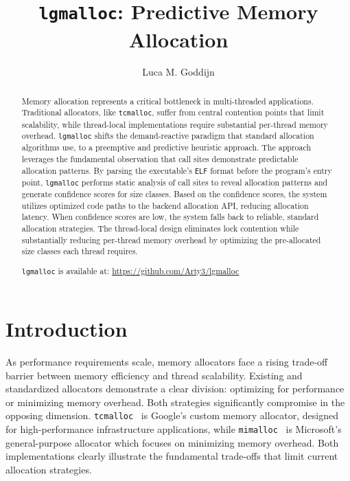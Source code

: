 \documentclass[sigconf,authordraft]{acmart}
\begin{document}

\title{\texttt{lgmalloc}: Predictive Memory Allocation}

\author{Luca M. Goddijn}

\begin{abstract}
  Memory allocation represents a critical bottleneck in multi-threaded applications.
  Traditional allocators, like \texttt{tcmalloc}, suffer from central contention points
  that limit scalability, while thread-local implementations require substantial
  per-thread memory overhead.
  \texttt{lgmalloc} shifts the demand-reactive paradigm that standard allocation
  algorithms use, to a preemptive and predictive heuristic approach.
  The approach leverages the fundamental observation that call sites demonstrate
  predictable allocation patterns.
  By parsing the executable's \texttt{ELF} format before the program's entry point,
  \texttt{lgmalloc} performs static analysis of call sites to reveal allocation
  patterns and generate confidence scores for size classes. Based on the confidence
  scores, the system utilizes optimized code paths to the backend allocation API,
  reducing allocation latency. When confidence scores are low, the system falls back to
  reliable, standard allocation strategies. The thread-local design eliminates lock
  contention while substantially reducing per-thread memory overhead by optimizing
  the pre-allocated size classes each thread requires.

  \texttt{lgmalloc} is available at: \url{https://github.com/Arty3/lgmalloc}
\end{abstract}


\maketitle

\section{Introduction}

As performance requirements scale, memory allocators face a rising trade-off barrier
between memory efficiency and thread scalability. Existing and standardized allocators
demonstrate a clear division: optimizing for performance or minimizing memory overhead.
Both strategies significantly compromise in the opposing dimension.
\texttt{tcmalloc}~\cite{tcmalloc} is Google's custom memory allocator, designed for
high-performance infrastructure applications, while \texttt{mimalloc}~\cite{mimalloc2019}
is Microsoft's general-purpose allocator which focuses on minimizing memory overhead.
Both implementations clearly illustrate the fundamental trade-offs that limit current
allocation strategies.
\end{document}
